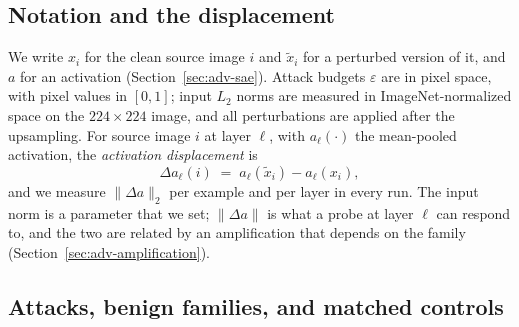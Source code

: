 \documentclass[../ppgc-tese.tex]{subfiles}
\begin{document}


\subsection{Notation and the displacement}
\label{sec:adv-dx-axis}
We write $x_i$ for the clean source image $i$ and $\tilde{x}_i$ for a perturbed
version of it, and $a$ for an activation (Section~\ref{sec:adv-sae}). Attack
budgets $\varepsilon$ are in pixel space, with pixel values in $[0,1]$; input
$L_2$ norms are measured in ImageNet-normalized space on the $224\times224$
image, and all perturbations are applied after the upsampling.
For source image $i$ at layer $\ell$, with $a_\ell(\cdot)$ the mean-pooled
activation, the \emph{activation displacement} is
\begin{equation}
  \Delta a_\ell(i) \;=\; a_\ell(\tilde{x}_i) - a_\ell(x_i),
  \label{eq:adv-dx}
\end{equation}
and we measure $\lVert\Delta a\rVert_2$ per example and per layer in every run.
The input norm is a parameter that we set; $\lVert\Delta a\rVert$ is what a
probe at layer $\ell$ can respond to, and the two are related by an
amplification that depends on the family
(Section~\ref{sec:adv-amplification}).

\subsection{Attacks, benign families, and matched controls}
\label{sec:adv-attacks}
\end{document}
